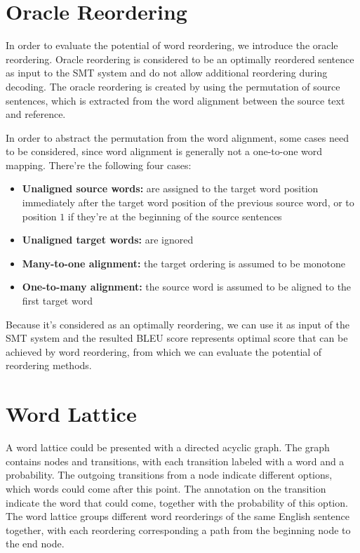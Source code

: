 \section{Oracle Reordering}
\label{ch:Foundations:sec:oracle}

In order to evaluate the potential of word reordering, we introduce the oracle reordering. Oracle reordering is considered to be an optimally reordered sentence as input to the SMT system and do not allow additional reordering during decoding. \citep{combine} The oracle reordering is created by using the permutation of source sentences, which is extracted from the word alignment between the source text and reference.

In order to abstract the permutation from the word alignment, some cases need to be considered, since word alignment is generally not a one-to-one word mapping. There're the following four cases: \citep{birch2}

\begin{itemize}
\setlength{\itemsep}{0cm}%
\setlength{\parskip}{0cm}%
\item \textbf{Unaligned source words:} are assigned to the target word position immediately after the target word position of the previous source word, or to position $1$ if they're at the beginning of the source sentences
\item \textbf{Unaligned target words:} are ignored
\item \textbf{Many-to-one alignment:} the target ordering is assumed to be monotone
\item \textbf{One-to-many alignment:} the source word is assumed to be aligned to the first target word
\end{itemize}

Because it's considered as an optimally reordering, we can use it as input of the SMT system and the resulted BLEU score represents optimal score that can be achieved by word reordering, from which we can evaluate the potential of reordering methods.

\section{Word Lattice}
\label{ch:Foundations:sec:Lattices}
\label{latticecreation}
A word lattice could be presented with a directed acyclic graph. The graph contains nodes and transitions, with each transition labeled with a word and a probability. The outgoing transitions from a node indicate different options, which words could come after this point. The annotation on the transition indicate the word that could come, together with the probability of this option. The word lattice groups different word reorderings of the same English sentence together, with each reordering corresponding a path from the beginning node to the end node. 

